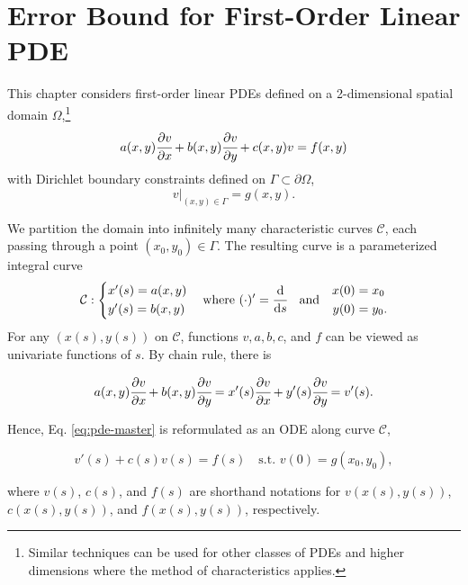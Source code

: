 \chapter{Error Bound for First-Order Linear PDE} \label{chapter:error-bound-for-pdes}
    This chapter considers first-order linear PDEs defined on a 2-dimensional spatial domain $\Omega$,\footnote{Similar techniques can be used for other classes of PDEs and higher dimensions where the method of characteristics applies.} 
    { 
        \begin{equation}\label{eq:pde-master}
            a(x, y) \cfrac{\partial v}{\partial x} + b(x, y) \cfrac{\partial v}{\partial y} + c(x, y)v = f(x, y)
        \end{equation}
    }
    with Dirichlet boundary constraints defined on $\Gamma \subset \partial \Omega$,
    {
        \begin{equation}\label{eq:pde-bc-master}
            v\big|_{(x, y) \in \Gamma} = g(x, y).
        \end{equation}
    }

    We partition the domain into infinitely many characteristic curves $\mathcal{C}$, each passing through a point $(x_0, y_0) \in \Gamma$. The resulting curve is a parameterized integral curve 
    {
        \begin{equation*} 
            \mathcal{C}: \begin{cases*}
                x'(s) = a(x, y) \\
                y'(s) = b(x, y) 
            \end{cases*} 
            \quad
            \text{where}
            \,\,
            (\cdot)' = \ds{}
            \quad
            \text{and} 
            \quad
            \begin{aligned}
                x(0) &= x_0 \\
                y(0) &= y_0.
            \end{aligned}
        \end{equation*}
    }
    For any $(x(s), y(s))$ on $\mathcal{C}$, functions $v, a, b, c$, and $f$ can be viewed as univariate functions of $s$. By chain rule, there is
    {
        
        \begin{equation*}
            a(x, y)\cfrac{\partial v}{\partial x} + b(x, y)\cfrac{\partial v}{\partial y} = x'(s)\cfrac{\partial v}{\partial x}  + y'(s)\cfrac{\partial v}{\partial y} = v'(s).
        \end{equation*}
    }
    Hence, Eq. \eqref{eq:pde-master} is reformulated as an ODE along curve $\mathcal{C}$,
    {
        
        \begin{equation}
            v'(s) + c(s) v(s) = f(s) \quad \text{s.t. } v(0) = g(x_0, y_0),
        \end{equation}
    }
    where $v(s)$, $c(s)$, and $f(s)$ are shorthand notations for $v(x(s),y(s))$, $c(x(s),y(s))$, and $f(x(s),y(s))$, respectively.

